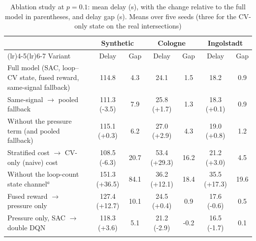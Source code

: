 \begin{table}[t]
\caption{Ablation study at $p=0.1$: mean delay (s), with the change relative to the full model in parentheses, and delay gap (s). Means over five seeds (three for the CV-only state on the real intersections)}
\label{tab:ablation}
\scriptsize
\setlength{\tabcolsep}{2.4pt}
\begin{tabular*}{\textwidth}{@{\extracolsep\fill}>{\raggedright\arraybackslash}p{4.3cm}cccccc@{}}
\toprule
 & \multicolumn{2}{c}{Synthetic} & \multicolumn{2}{c}{Cologne} & \multicolumn{2}{c}{Ingolstadt}\\
\cmidrule(lr){2-3}\cmidrule(lr){4-5}\cmidrule(lr){6-7}
Variant & Delay & Gap & Delay & Gap & Delay & Gap\\
\midrule
Full model (SAC, loop--CV state, fused reward, same-signal fallback) & 114.8 & 4.3 & 24.1 & 1.5 & 18.2 & 0.9\\
Same-signal $\to$ pooled fallback & 111.3 (-3.5) & 7.9 & 25.8 (+1.7) & 1.3 & 18.3 (+0.1) & 0.9\\
Without the pressure term (and pooled fallback) & 115.1 (+0.3) & 6.2 & 27.0 (+2.9) & 4.3 & 19.0 (+0.8) & 1.2\\
Stratified cost $\to$ CV-only (naive) cost & 108.5 (-6.3) & 20.7 & 53.4 (+29.3) & 16.2 & 21.2 (+3.0) & 4.5\\
Without the loop-count state channel$^a$ & 151.3 (+36.5) & 84.1 & 36.2 (+12.1) & 18.4 & 35.5 (+17.3) & 19.6\\
Fused reward $\to$ pressure only & 127.4 (+12.7) & 10.1 & 24.5 (+0.4) & 0.9 & 17.6 (-0.6) & 0.5\\
Pressure only, SAC $\to$ double DQN & 118.3 (+3.6) & 5.1 & 21.2 (-2.9) & -0.2 & 16.5 (-1.7) & 0.1\\
\botrule
\end{tabular*}
\end{table}
